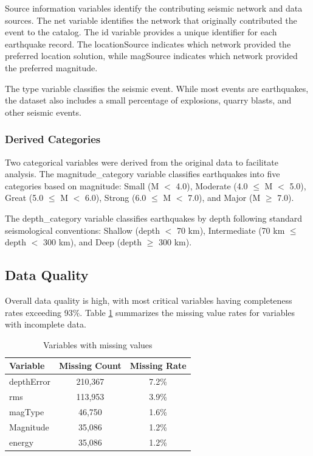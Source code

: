 Source information variables identify the contributing seismic network and data sources. The net variable identifies the network that originally contributed the event to the catalog. The id variable provides a unique identifier for each earthquake record. The locationSource indicates which network provided the preferred location solution, while magSource indicates which network provided the preferred magnitude.

The type variable classifies the seismic event. While most events are earthquakes, the dataset also includes a small percentage of explosions, quarry blasts, and other seismic events.

\subsubsection{Derived Categories}

Two categorical variables were derived from the original data to facilitate analysis. The magnitude\_category variable classifies earthquakes into five categories based on magnitude: Small (M $<$ 4.0), Moderate (4.0 $\leq$ M $<$ 5.0), Great (5.0 $\leq$ M $<$ 6.0), Strong (6.0 $\leq$ M $<$ 7.0), and Major (M $\geq$ 7.0).

The depth\_category variable classifies earthquakes by depth following standard seismological conventions: Shallow (depth $<$ 70 km), Intermediate (70 km $\leq$ depth $<$ 300 km), and Deep (depth $\geq$ 300 km).

\subsection{Data Quality}

Overall data quality is high, with most critical variables having completeness rates exceeding 93\%. Table \ref{tab:missing} summarizes the missing value rates for variables with incomplete data.

\begin{table}[H]
\centering
\caption{Variables with missing values}
\label{tab:missing}
\begin{tabular}{|l|c|c|}
\hline
\textbf{Variable} & \textbf{Missing Count} & \textbf{Missing Rate} \\
\hline
depthError & 210,367 & 7.2\% \\
rms & 113,953 & 3.9\% \\
magType & 46,750 & 1.6\% \\
Magnitude & 35,086 & 1.2\% \\
energy & 35,086 & 1.2\% \\
\hline
\end{tabular}
\end{table}

